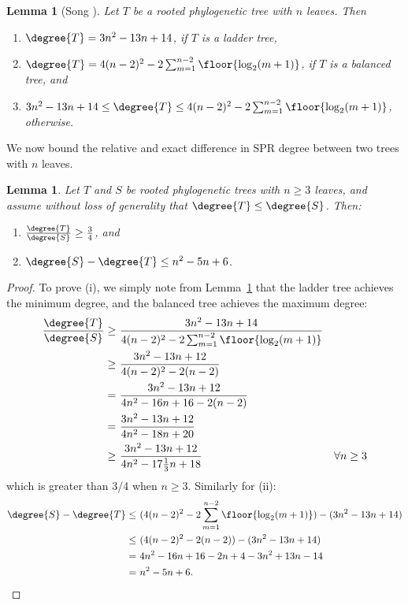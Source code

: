 \documentclass{amsart}
\newtheorem{lemma}[theorem]{Lemma}
\newcommand{\cuttable}[1]{#1} %
\begin{document}
\begin{lemma}[{Song \cite{Song2003-gf}}]
    \pushQED{\qed}
	\label{lem:degree_extremes}
	Let $T$ be a rooted phylogenetic tree with $n$ leaves. Then
	\begin{enumerate}
		\item $\degree{T} = 3n^2 - 13n + 14$, if $T$ is a ladder tree,
		\item $\degree{T} = 4(n-2)^2 - 2 \sum_{m=1}^{n-2} \floor{\log_2(m+1)}$, if $T$ is a balanced tree, and
		\item  $3n^2 - 13n + 14 \le \degree{T} \le 4(n-2)^2 - 2 \sum_{m=1}^{n-2} \floor{\log_2(m+1)}$, otherwise.
	\end{enumerate}
    \popQED
\end{lemma}

We now bound the relative and exact difference in SPR degree between two trees with $n$ leaves.

\begin{lemma}
	\label{lem:degree_max_delta}
	Let $T$ and $S$ be rooted phylogenetic trees with $n \ge 3$ leaves, and assume without loss of generality that $\degree{T} \le \degree{S}$.
	Then:
	\begin{enumerate}
		\item $\frac{\degree{T}}{\degree{S}} \ge \frac{3}{4}$, and
		\item $\degree{S} - \degree{T} \le n^2 - 5n + 6$.
	\end{enumerate}
\end{lemma}
\begin{proof}
	To prove (i), we simply note from Lemma~\ref{lem:degree_extremes} that the ladder tree achieves the minimum degree, and the balanced tree achieves the maximum degree:
	\begin{align*}
		\frac{\degree{T}}{\degree{S}} \ge\ &\frac{3n^2 - 13n + 14}{4(n-2)^2 - 2 \sum_{m=1}^{n-2} \floor{\log_2(m+1)}} \\
		\ge\ &\frac{3n^2 - 13n + 12}{4(n-2)^2 - 2(n-2)} \\
		\cuttable{= \ &\frac{3n^2 - 13n + 12}{4n^2 - 16n + 16 - 2(n-2)} \\}
		= \ &\frac{3n^2 - 13n + 12}{4n^2 - 18n + 20} \\
		\cuttable{\ge\ &\frac{3n^2 - 13n + 12}{4n^2 - 17\frac{1}{3}n + 18} &\forall n \ge 3 \\}
	\end{align*}
	which is greater than 3/4 when $n \ge 3$.
    Similarly for (ii):
	\begin{align*}
		\cuttable{\degree{S} - \degree{T}
		\le\ &(4(n-2)^2 - 2 \sum_{m=1}^{n-2} \floor{\log_2(m+1)})
		- (3n^2 - 13n + 14) \\}
		\le\ &(4(n-2)^2 - 2(n-2)) - (3n^2 - 13n + 14) \\
		\cuttable{=\ &4n^2 - 16n + 16 - 2n +4 - 3n^2 + 13n - 14 \\}
		=\ &n^2 - 5n + 6.
	\end{align*}
\end{proof}
\end{document}
